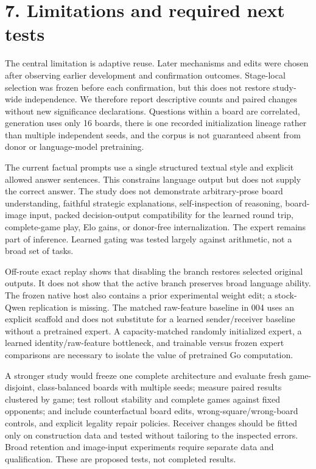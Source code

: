 \documentclass[11pt]{article}
\begin{document}
\section*{7. Limitations and required next tests}
The central limitation is adaptive reuse. Later mechanisms and edits were chosen after observing earlier development and confirmation outcomes. Stage-local selection was frozen before each confirmation, but this does not restore study-wide independence. We therefore report descriptive counts and paired changes without new significance declarations. Questions within a board are correlated, generation uses only 16 boards, there is one recorded initialization lineage rather than multiple independent seeds, and the corpus is not guaranteed absent from donor or language-model pretraining.

The current factual prompts use a single structured textual style and explicit allowed answer sentences. This constrains language output but does not supply the correct answer. The study does not demonstrate arbitrary-prose board understanding, faithful strategic explanations, self-inspection of reasoning, board-image input, packed decision-output compatibility for the learned round trip, complete-game play, Elo gains, or donor-free internalization. The expert remains part of inference. Learned gating was tested largely against arithmetic, not a broad set of tasks.

Off-route exact replay shows that disabling the branch restores selected original outputs. It does not show that the active branch preserves broad language ability. The frozen native host also contains a prior experimental weight edit; a stock-Qwen replication is missing. The matched raw-feature baseline in 004 uses an explicit scaffold and does not substitute for a learned sender/receiver baseline without a pretrained expert. A capacity-matched randomly initialized expert, a learned identity/raw-feature bottleneck, and trainable versus frozen expert comparisons are necessary to isolate the value of pretrained Go computation.

A stronger study would freeze one complete architecture and evaluate fresh game-disjoint, class-balanced boards with multiple seeds; measure paired results clustered by game; test rollout stability and complete games against fixed opponents; and include counterfactual board edits, wrong-square/wrong-board controls, and explicit legality repair policies. Receiver changes should be fitted only on construction data and tested without tailoring to the inspected errors. Broad retention and image-input experiments require separate data and qualification. These are proposed tests, not completed results.
\end{document}

